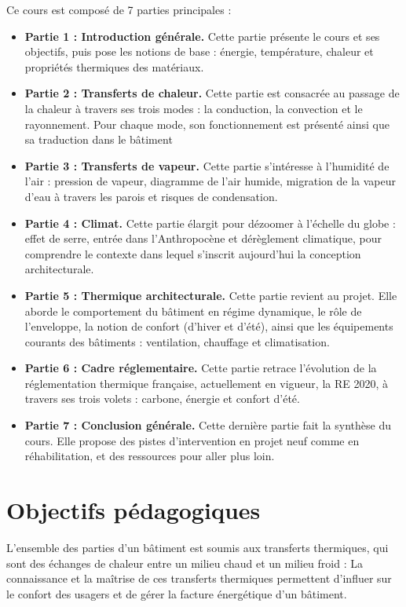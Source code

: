 Ce cours est composé de 7 parties principales :
\begin{itemize}
  \item \textbf{Partie 1 : Introduction générale.} Cette partie présente le cours et ses objectifs, puis pose les notions de base : énergie, température, chaleur et propriétés thermiques des matériaux.

  \item \textbf{Partie 2 : Transferts de chaleur.} Cette partie est consacrée au passage de la chaleur à travers ses trois modes : la conduction, la convection et le rayonnement. Pour chaque mode, son fonctionnement est présenté ainsi que sa traduction dans le bâtiment

  \item \textbf{Partie 3 : Transferts de vapeur.} Cette partie s'intéresse à l'humidité de l'air : pression de vapeur, diagramme de l'air humide, migration de la vapeur d'eau à travers les parois et risques de condensation.

  \item \textbf{Partie 4 : Climat.} Cette partie élargit pour dézoomer  à l'échelle du globe : effet de serre, entrée dans l'Anthropocène et dérèglement climatique, pour comprendre le contexte dans lequel s'inscrit aujourd'hui la conception architecturale.

  \item \textbf{Partie 5 : Thermique architecturale.} Cette partie revient au projet. Elle aborde le comportement du bâtiment en régime dynamique, le rôle de l'enveloppe, la notion de confort (d'hiver et d'été), ainsi que les équipements courants des bâtiments : ventilation, chauffage et climatisation.

  \item \textbf{Partie 6 : Cadre réglementaire.} Cette partie retrace l'évolution de la réglementation thermique française, actuellement en vigueur, la RE 2020, à travers ses trois volets : carbone, énergie et confort d'été.

  \item \textbf{Partie 7 : Conclusion générale.} Cette dernière partie fait la synthèse du cours. Elle propose des pistes d'intervention en projet neuf comme en réhabilitation, et des ressources pour aller plus loin.
\end{itemize}

\section{Objectifs pédagogiques}
L'ensemble des parties d'un bâtiment est soumis aux transferts thermiques, 
qui sont des échanges de chaleur entre un milieu chaud et un milieu froid : La connaissance et la maîtrise de ces transferts thermiques permettent d’influer sur le confort des usagers et de gérer la facture énergétique d'un bâtiment.

